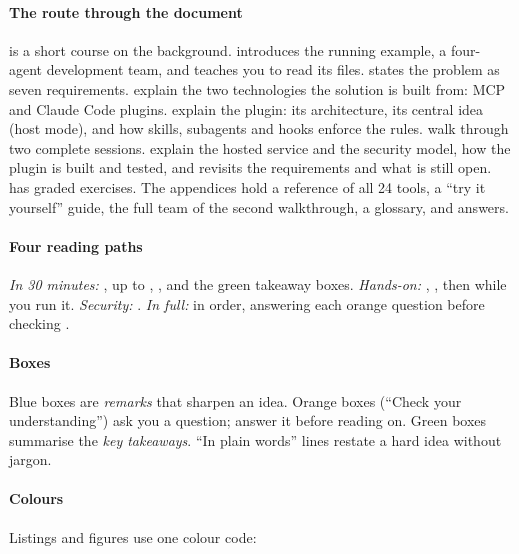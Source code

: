 \documentclass[10pt,a4paper]{article}
\newcommand{\cc}{Claude Code}
\newcounter{remark}
\begin{document}
\paragraph{The route through the document}
 is a short course on the background.
 introduces the running example, a four-agent
development team, and teaches you to read its files.
 states the problem as seven requirements.
 explain the two technologies the solution is
built from: MCP and \cc{} plugins.
 explain the plugin: its architecture, its
central idea (host mode), and how skills, subagents and hooks enforce the
rules.  walk through two complete sessions.
 explain the hosted service and the security
model,  how the plugin is built and tested, and
 revisits the requirements and what is still open.
 has graded exercises. The appendices hold a reference
of all 24 tools, a ``try it yourself'' guide, the full team of the second
walkthrough, a glossary, and answers.

\paragraph{Four reading paths}
\emph{In 30 minutes:} ,  up to
, ,
and the green takeaway boxes.
\emph{Hands-on:} , , then
 while you run it.
\emph{Security:} .
\emph{In full:} in order, answering each orange question before checking
.

\paragraph{Boxes} Blue boxes are \emph{remarks} that sharpen an idea.
Orange boxes (``Check your understanding'') ask you a question; answer it
before reading on. Green boxes summarise the \emph{key takeaways}.
``In plain words'' lines restate a hard idea without jargon.

\paragraph{Colours} Listings and figures use one colour code:
\end{document}
